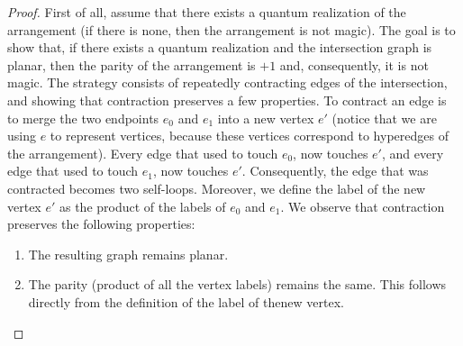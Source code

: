 \documentclass{llncs}
\begin{document}
\begin{proof}
  First of all, assume that there exists a quantum realization of the
  arrangement (if there is none, then the arrangement is not magic).
  The goal is to show that, if there exists a quantum realization and
  the intersection graph is planar, then the parity of the arrangement
  is \(+1\) and, consequently, it is not magic. The strategy consists
  of repeatedly contracting edges of the intersection, and showing
  that contraction preserves a few properties. To contract an edge is
  to merge the two endpoints \(e_{0}\) and \(e_{1}\) into a new vertex
  \(e'\) (notice that we are using \(e\) to represent vertices,
  because these vertices correspond to hyperedges of the
  arrangement). Every edge that used to touch \(e_{0}\), now touches
  \(e'\), and every edge that used to touch \(e_{1}\), now touches
  \(e'\). Consequently, the edge that was contracted becomes two
  self-loops. Moreover, we define the label of the new vertex \(e'\)
  as the product of the labels of \(e_{0}\) and \(e_{1}\). We observe
  that contraction preserves the following properties:

  \begin{enumerate}
  \item The resulting graph remains planar.

  \item The parity (product of all the vertex labels) remains the
    same. This follows directly from the definition of the label of
    thenew vertex.


\end{enumerate}
\end{proof}
\end{document}
